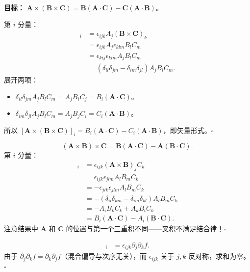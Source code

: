 \begin{example}
\textbf{目标：} $\mathbf{A}\times(\mathbf{B}\times\mathbf{C}) = \mathbf{B}(\mathbf{A}\cdot\mathbf{C}) - \mathbf{C}(\mathbf{A}\cdot\mathbf{B})$。

第 $i$ 分量：
\begin{align*}
[\mathbf{A}\times(\mathbf{B}\times\mathbf{C})]_i
&= \epsilon_{ijk}A_j(\mathbf{B}\times\mathbf{C})_k \\
&= \epsilon_{ijk}A_j\epsilon_{klm}B_lC_m \\
&= \epsilon_{kij}\epsilon_{klm}A_jB_lC_m \\
&= (\delta_{il}\delta_{jm} - \delta_{im}\delta_{jl})A_jB_lC_m.
\end{align*}
展开两项：
\begin{itemize}
\item $\delta_{il}\delta_{jm}A_jB_lC_m = A_jB_iC_j = B_i(\mathbf{A}\cdot\mathbf{C})$。
\item $\delta_{im}\delta_{jl}A_jB_lC_m = A_jB_jC_i = C_i(\mathbf{A}\cdot\mathbf{B})$。
\end{itemize}
所以 $[\mathbf{A}\times(\mathbf{B}\times\mathbf{C})]_i = B_i(\mathbf{A}\cdot\mathbf{C}) - C_i(\mathbf{A}\cdot\mathbf{B})$，即矢量形式。$\square$
\end{example}

\begin{example}
\[
(\mathbf{A}\times\mathbf{B})\times\mathbf{C} = \mathbf{B}(\mathbf{A}\cdot\mathbf{C}) - \mathbf{A}(\mathbf{B}\cdot\mathbf{C}).
\]
第 $i$ 分量：
\begin{align*}
[(\mathbf{A}\times\mathbf{B})\times\mathbf{C}]_i
&= \epsilon_{ijk}(\mathbf{A}\times\mathbf{B})_jC_k \\
&= \epsilon_{ijk}\epsilon_{jlm}A_lB_mC_k \\
&= -\epsilon_{jik}\epsilon_{jlm}A_lB_mC_k \\
&= -(\delta_{il}\delta_{km} - \delta_{im}\delta_{kl})A_lB_mC_k \\
&= -A_iB_kC_k + A_kB_iC_k \\
&= B_i(\mathbf{A}\cdot\mathbf{C}) - A_i(\mathbf{B}\cdot\mathbf{C}).
\end{align*}
注意结果中 $\mathbf{A}$ 和 $\mathbf{C}$ 的位置与第一个三重积不同——叉积不满足结合律！$\square$
\end{example}

\begin{example}[证明 $\nabla\times(\nabla f) = 0$]
\begin{align*}
[\nabla\times(\nabla f)]_i
&= \epsilon_{ijk}\partial_j\partial_k f.
\end{align*}
由于 $\partial_j\partial_k f = \partial_k\partial_j f$（混合偏导与次序无关），而 $\epsilon_{ijk}$ 关于 $j,k$ 反对称，求和为零。$\square$
\end{example}

